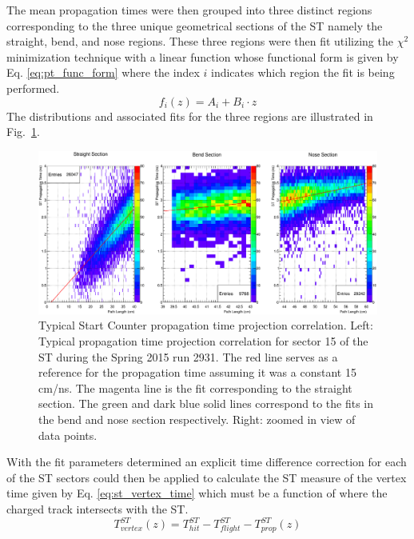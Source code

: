 {The mean propagation times were then grouped into three distinct regions corresponding to the three unique geometrical sections of the ST namely the straight, bend, and nose regions.  These three regions were then fit utilizing the $\chi^{2}$ minimization technique with a linear function whose functional form is given by Eq. \ref{eq:pt_func_form} where the index $i$ indicates which region the fit is being performed.
	\begin{equation} \label{eq:pt_func_form}
		f_{i}(z) = A_{i} + B_{i} \cdot z
	\end{equation}
The distributions and associated fits for the three regions are illustrated in Fig.~\ref{fig:proptimeuncorrfits}.
	\begin{figure}[!htb]
		\centering
		\includegraphics[width=1.0\columnwidth]{calibration/figs/prop_time_uncorr_fits}
		\caption{Typical Start Counter propagation time projection correlation.  Left: Typical propagation time projection correlation for sector 15 of the ST during the Spring 2015 run 2931.  The red line serves as a reference for the propagation time assuming it was a constant 15 cm/ns.  The magenta line is the fit corresponding to the straight section.  The green and dark blue solid lines correspond to the fits in the bend and nose section respectively.  Right: zoomed in view of data points.}
		\label{fig:proptimeuncorrfits}
	\end{figure}
	
With the fit parameters determined an explicit time difference correction for each of the ST sectors could then be applied to calculate the ST measure of the vertex time given by Eq. \ref{eq:st_vertex_time} which must be a function of where the charged track intersects with the ST.
	\begin{equation}\label{eq:st_vertex_time}
	 	T^{ST}_{vertex}(z) = T^{ST}_{hit} - T^{ST}_{flight} - T^{ST}_{prop}(z)
	\end{equation} 
	
}

